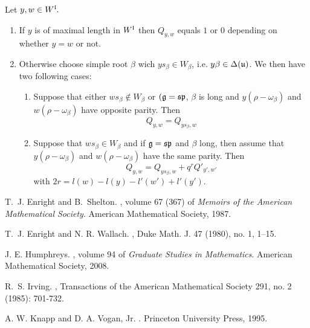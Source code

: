 \documentclass[a4paper,10pt]{article}
\begin{document}
\begin{theorem}
	Let $y,w \in W^{\mathfrak{l}}.$
	\begin{enumerate}
		\item If $y$ is of maximal length in $W^{\mathfrak{l}}$ then $Q_{y,w}$ equals $1$ or $0$ depending on whether $y=w$ or not.
		\item Otherwise choose simple root $\beta$ wich $ys_\beta \in W_\beta$, i.e. $y\beta \in \Delta(\mathfrak{u})$. We then have two following cases:
		\begin{enumerate}
			\item Suppose that either $ws_\beta \notin W_\beta$ or $(\mathfrak{g} = \mathfrak{sp}$, $\beta$ is long and $y(\rho - \omega_\beta)$ and $w(\rho-\omega_\beta)$ have opposite parity. Then
			\[
				Q_{y,w} = Q_{ys_\beta, w}
			\]
			\item Suppose that $ws_\beta \in W_\beta$ and if $\mathfrak{g} = \mathfrak{sp}$ and $\beta$ long, then assume that  $y(\rho - \omega_\beta)$ and $w(\rho-\omega_\beta)$ have the same parity. Then
			\[
				Q_{y,w} = Q_{ys_\beta, w} + q^r Q'_{y', w'}
			\]
			with $2r = l(w) - l(y) - l'(w') + l'(y').$
		\end{enumerate}
	\end{enumerate}
\end{theorem}


\begin{thebibliography}{AHS}
	 T.~J. Enright and B.~Shelton.
, volume 67 (367) of {\em Memoirs of the American
  Mathematical Society}.
\newblock American Mathematical Society, 1987.

	 T.~J. Enright and N. R. Wallach.
, Duke Math. J. 47 (1980), no. 1, 1--15.

	 J. E. Humphreys.
, volume 94 of {\em Graduate Studies in Mathematics}.
\newblock American Mathematical Society, 2008.

	 R.~S. Irving.
, Transactions of the American Mathematical Society 291, no. 2 (1985): 701-732.


	 A. W. Knapp and D. A. Vogan, Jr.
.
\newblock Princeton University Press, 1995.





\end{thebibliography}
\end{document}
